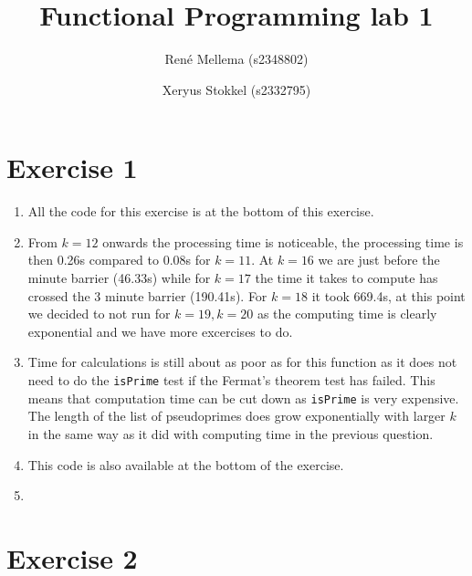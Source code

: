 \documentclass[a4paper]{article}
\title{Functional Programming lab 1}
\author{Ren\'e Mellema (s2348802) \and Xeryus Stokkel (s2332795)}
\begin{document}
\maketitle

\section*{Exercise 1}
\begin{enumerate}
	\item All the code for this exercise is at the bottom of this exercise.
	\item From $k=12$ onwards the processing time is noticeable, the processing time is then 0.26s compared to 0.08s for $k=11$. At $k=16$ we are just before the minute barrier (46.33s) while for $k=17$ the time it takes to compute has crossed the 3 minute barrier (190.41s). For $k=18$ it took 669.4s, at this point we decided to not run for $k=19,k=20$ as the computing time is clearly exponential and we have more excercises to do.
	\item Time for calculations is still about as poor as for this function as it does not need to do the \texttt{isPrime} test if the Fermat's theorem test has failed. This means that computation time can be cut down as \texttt{isPrime} is very expensive. The length of the list of pseudoprimes does grow exponentially with larger $k$ in the same way as it did with computing time in the previous question.
	\item This code is also available at the bottom of the exercise.
	\item 
\end{enumerate}



\section*{Exercise 2}

\end{document}
